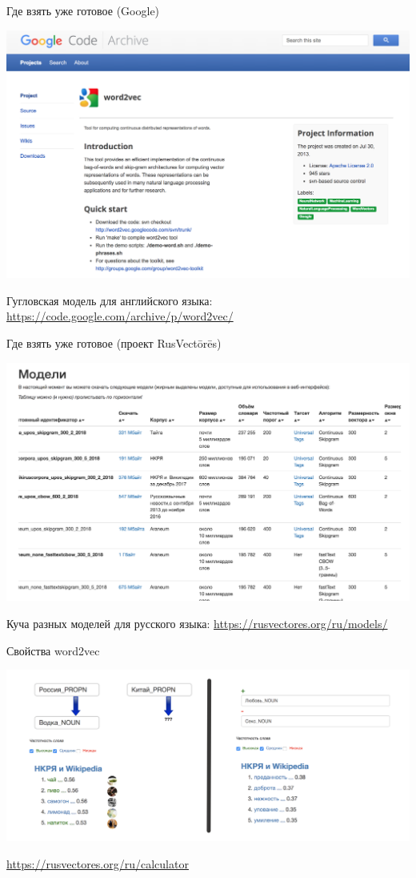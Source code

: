 \documentclass[notes,12pt, aspectratio=169]{beamer}
\begin{document}
\begin{frame}{Где взять уже готовое (Google)}
	\begin{center}
		\includegraphics[width=.65\linewidth]{google_wv.png}
	\end{center}

	\vfill
	
	\footnotesize Гугловская модель для английского языка:  {\color{blue} \url{https://code.google.com/archive/p/word2vec/}}
\end{frame} 
	
	
\begin{frame}{Где взять уже готовое (проект RusVectōrēs)}
	\begin{center}
		\includegraphics[width=.7\linewidth]{rusvec_models.png}
	\end{center}
	
		\vfill
	
		\footnotesize Куча разных моделей для русского языка:  {\color{blue} \url{https://rusvectores.org/ru/models/}}
\end{frame} 


\begin{frame}{Свойства word2vec}
	\begin{center}
		\includegraphics[width=.85\linewidth]{rusvec_calc2.png}
	\end{center}
	\vfill
	\footnotesize  {\color{blue} \url{https://rusvectores.org/ru/calculator}}
\end{frame} 
\end{document}
